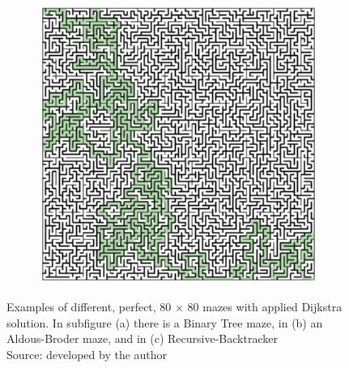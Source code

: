 \begin{figure}[!h]
\begin{subfigure}{.30\textwidth}
	  \caption{}
	  \label{fig:sub2}
	\end{subfigure}
    \begin{subfigure}{.30\textwidth}
        \centering
        \includegraphics[width=1\linewidth]{perfectRecursive.png}
        \caption{}
        \label{fig:sub2}
      \end{subfigure}
	\caption{Examples of different, perfect,  80 $\times$ 80 mazes with applied Dijkstra solution. In subfigure (a) there is a Binary Tree maze, in (b) an Aldous-Broder maze, and in (c) Recursive-Backtracker
    \\Source: developed by the author}
	\label{fig:test}
	\end{figure}

